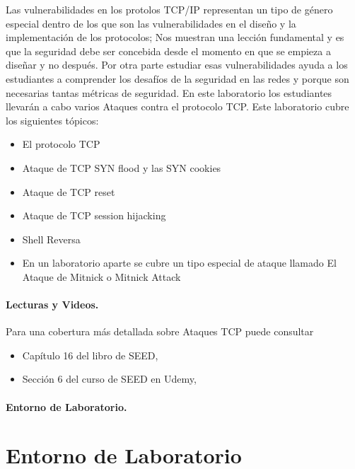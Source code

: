Las vulnerabilidades en los protolos TCP/IP representan un tipo de género especial dentro de los que son las vulnerabilidades en el diseño y la implementación de los protocolos; Nos muestran una lección fundamental y es que la seguridad debe ser concebida desde el momento en que se empieza a diseñar y no después. Por otra parte estudiar esas vulnerabilidades ayuda a los estudiantes a comprender los desafíos de la seguridad en las redes y porque son necesarias tantas métricas de seguridad.
En este laboratorio los estudiantes llevarán a cabo varios Ataques contra el protocolo TCP.
Este laboratorio cubre los siguientes tópicos:

\begin{itemize}[noitemsep]
\item El protocolo TCP
\item Ataque de TCP SYN flood y las SYN cookies 
\item Ataque de TCP reset 
\item Ataque de TCP session hijacking
\item Shell Reversa
\item En un laboratorio aparte se cubre un tipo especial de ataque llamado El Ataque de Mitnick o Mitnick Attack
\end{itemize}


\paragraph{Lecturas y Videos.}
Para una cobertura más detallada sobre Ataques TCP puede consultar

\begin{itemize}
\item Capítulo 16 del libro de SEED, \seedbook
\item Sección 6 del curso de SEED en Udemy, \seedisvideo
\end{itemize}


\paragraph{Entorno de Laboratorio.} \seedenvironmentC



\section{Entorno de Laboratorio}

